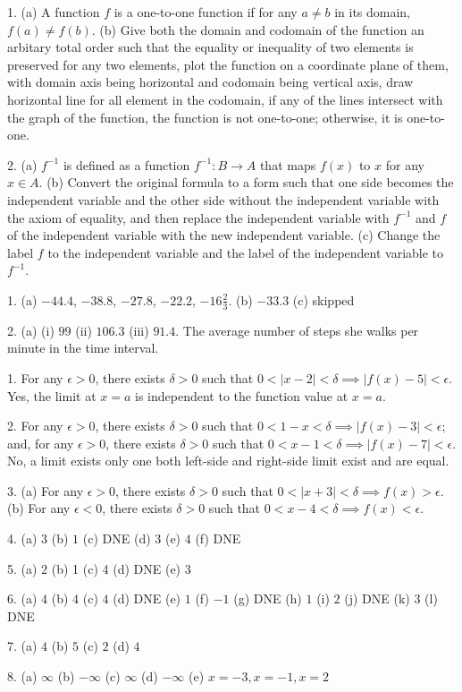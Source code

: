 \documentclass[a4paper,12pt]{article}
\begin{document}
1. (a) A function $f$ is a one-to-one function if for any $a\neq b$ in its domain, $f(a)\neq f(b)$. (b) Give both the domain and codomain of the function an arbitary total order such that the equality or inequality of two elements is preserved for any two elements, plot the function on a coordinate plane of them, with domain axis being horizontal and codomain being vertical axis, draw horizontal line for all element in the codomain, if any of the lines intersect with the graph of the function, the function is not one-to-one; otherwise, it is one-to-one.

2. (a) $f^{-1}$ is defined as a function $f^{-1}\colon B\to A$ that maps $f(x)$ to $x$ for any $x\in A$. (b) Convert the original formula to a form such that one side becomes the independent variable and the other side without the independent variable with the axiom of equality, and then replace the independent variable with $f^{-1}$ and $f$ of the independent variable with the new independent variable. (c) Change the label $f$ to the independent variable and the label of the independent variable to $f^{-1}$.

1. (a) $-44.4$, $-38.8$, $-27.8$, $-22.2$, $-16\frac{2}{3}$. (b) $-33.3$ (c) skipped

2. (a) (i) $99$ (ii) $106.3$ (iii) $91.4$. The average number of steps she walks per minute in the time interval.

1. For any $\epsilon>0$, there exists $\delta>0$ such that $0<|x-2|<\delta\implies|f(x)-5|<\epsilon$. Yes, the limit at $x=a$ is independent to the function value at $x=a$.

2. For any $\epsilon>0$, there exists $\delta>0$ such that $0<1-x<\delta\implies|f(x)-3|<\epsilon$; and, for any $\epsilon>0$, there exists $\delta>0$ such that $0<x-1<\delta\implies|f(x)-7|<\epsilon$. No, a limit exists only one both left-side and right-side limit exist and are equal.

3. (a) For any $\epsilon>0$, there exists $\delta>0$ such that $0<|x+3|<\delta\implies f(x)>\epsilon$. (b) For any $\epsilon<0$, there exists $\delta>0$ such that $0<x-4<\delta\implies f(x)<\epsilon$.

4. (a) $3$ (b) $1$ (c) DNE (d) $3$ (e) $4$ (f) DNE

5. (a) $2$ (b) 1 (c) 4 (d) DNE (e) 3

6. (a) $4$ (b) $4$ (c) $4$ (d) DNE (e) $1$ (f) $-1$ (g) DNE (h) $1$ (i) $2$ (j) DNE (k) $3$ (l) DNE

7. (a) $4$ (b) $5$ (c) $2$ (d) $4$

8. (a) $\infty$ (b) $-\infty$ (c) $\infty$ (d) $-\infty$ (e) $x=-3, x=-1, x=2$
\end{document}
